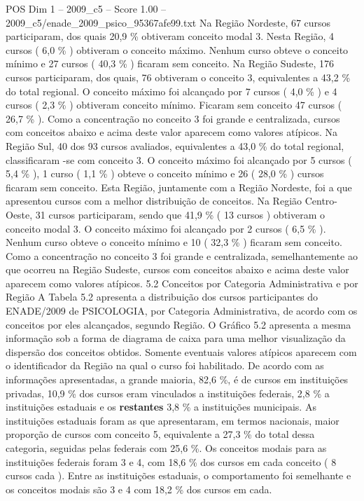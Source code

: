 \begin{textsample}{POS Dim 1 – 2009\_c5 – Score 1.00 – 2009\_c5/enade\_2009\_psico\_95367afe99.txt}
Na Região Nordeste, 67 cursos participaram, dos quais 20,9 \% obtiveram conceito modal 3.
Nesta Região, 4 cursos ( 6,0 \% ) obtiveram o conceito máximo.
Nenhum curso obteve o conceito mínimo e 27 cursos ( 40,3 \% ) ficaram sem conceito.
Na Região Sudeste, 176 cursos participaram, dos quais, 76 obtiveram o conceito 3, equivalentes a 43,2 \% do total regional.
O conceito máximo foi alcançado por 7 cursos ( 4,0 \% ) e 4 cursos ( 2,3 \% ) obtiveram conceito mínimo.
Ficaram sem conceito 47 cursos ( 26,7 \% ).
Como a concentração no conceito 3 foi grande e centralizada, cursos com conceitos abaixo e acima deste valor aparecem como valores atípicos.
Na Região Sul, 40 dos 93 cursos avaliados, equivalentes a 43,0 \% do total regional, classificaram -se com conceito 3.
O conceito máximo foi alcançado por 5 cursos ( 5,4 \% ), 1 curso ( 1,1 \% ) obteve o conceito mínimo e 26 ( 28,0 \% ) cursos ficaram sem conceito.
Esta Região, juntamente com a Região Nordeste, foi a que apresentou cursos com a melhor distribuição de conceitos.
Na Região Centro-Oeste, 31 cursos participaram, sendo que 41,9 \% ( 13 cursos ) obtiveram o conceito modal 3.
O conceito máximo foi alcançado por 2 cursos ( 6,5 \% ).
Nenhum curso obteve o conceito mínimo e 10 ( 32,3 \% ) ficaram sem conceito.
Como a concentração no conceito 3 foi grande e centralizada, semelhantemente ao que ocorreu na Região Sudeste, cursos com conceitos abaixo e acima deste valor aparecem como valores atípicos. 5.2 Conceitos por Categoria Administrativa e por Região A Tabela 5.2 apresenta a distribuição dos cursos participantes do ENADE/2009 de PSICOLOGIA, por Categoria Administrativa, de acordo com os conceitos por eles alcançados, segundo Região.
O Gráfico 5.2 apresenta a mesma informação sob a forma de diagrama de caixa para uma melhor visualização da dispersão dos conceitos obtidos.
Somente eventuais valores atípicos aparecem com o identificador da Região na qual o curso foi habilitado.
De acordo com as informações apresentadas, a grande maioria, 82,6 \%, é de cursos em instituições privadas, 10,9 \% dos cursos eram vinculados a instituições federais, 2,8 \% a instituições estaduais e os \textbf{restantes} 3,8 \% a instituições municipais.
As instituições estaduais foram as que apresentaram, em termos nacionais, maior proporção de cursos com conceito 5, equivalente a 27,3 \% do total dessa categoria, seguidas pelas federais com 25,6 \%.
Os conceitos modais para as instituições federais foram 3 e 4, com 18,6 \% dos cursos em cada conceito ( 8 cursos cada ).
Entre as instituições estaduais, o comportamento foi semelhante e os conceitos modais são 3 e 4 com 18,2 \% dos cursos em cada.

\end{textsample}
